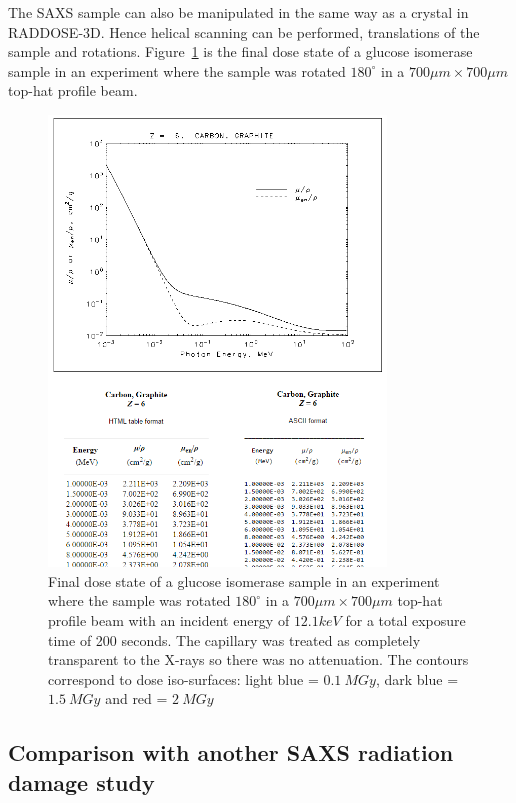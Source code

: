 The SAXS sample can also be manipulated in the same way as a crystal in RADDOSE-3D. Hence helical scanning can be performed, translations of the sample and rotations. Figure~\ref{fig:SAXS cylinder rotated} is the final dose state of a glucose isomerase sample in an experiment where the sample was rotated $180^{\circ}$ in a $ 700 \mu m \times 700 \mu m $ top-hat profile beam.
\begin{figure}
    \centering
    \includegraphics[width=0.8\textwidth]{figures/saxs/nist_table_carbon.png}
    \caption{Final dose state of a glucose isomerase sample in an experiment where the sample was rotated $180^{\circ}$ in a $ 700 \mu m \times 700 \mu m $ top-hat profile beam with an incident energy of $ 12.1 keV $ for a total exposure time of 200 seconds. The capillary was treated as completely transparent to the X-rays so there was no attenuation. The contours correspond to dose iso-surfaces: light blue = $ 0.1\ MGy $, dark blue = $ 1.5\ MGy $ and red = $ 2\ MGy $ }
    \label{fig:SAXS cylinder rotated}
\end{figure}

\subsection{Comparison with another SAXS radiation damage study}
\label{sub:Comparison with another SAXS radiation damage study}
